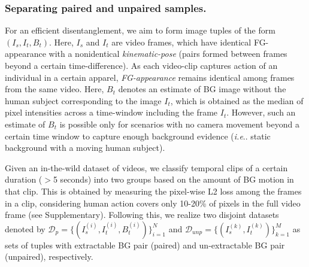 \documentclass[letterpaper]{article} \usepackage{aaai20}  \usepackage{times}  \usepackage{helvet}  \usepackage{courier}  \usepackage{url}  \usepackage{graphicx}  \usepackage{amsmath}
\makeatletter
\DeclareRobustCommand\onedot{\futurelet\@let@token\@onedot}
\def\@onedot{\ifx\@let@token.\else.\null\fi\xspace}
\def\ie{\emph{i.e}\onedot} \def\Ie{\emph{I.e}\onedot}
\makeatother
\begin{document}
\subsubsection{Separating paired and unpaired samples.}


For an efficient disentanglement, we aim to form image tuples of the form $(I_s,I_t, B_t)$. Here, $I_s$ and $I_t$ are video frames, which have identical FG-appearance with a nonidentical \textit{kinematic-pose} (pairs formed between frames beyond a certain time-difference). As each video-clip captures action of an individual in a certain apparel, \textit{FG-appearance} remains identical among frames from the same video. Here, $B_t$ denotes an estimate of BG image without the human subject corresponding to the image $I_t$, which is obtained as the median of pixel intensities across a time-window including the frame $I_t$. However, such an estimate of $B_t$ is possible only for scenarios with no camera movement beyond a certain time window to capture enough background evidence (\ie static background with a moving human subject).

Given an in-the-wild dataset of videos, we classify temporal clips of a certain duration ($>$5 seconds) into two groups based on the amount of BG motion in that clip. This is obtained by measuring the pixel-wise L2 loss among the frames in a clip, considering human action covers only 10-20\% of pixels in the full video frame (see Supplementary). Following this, we realize two disjoint datasets denoted by $\mathcal{D}_{p}=\{(I_s^{(i)},I_t^{(i)},B_t^{(i)})\}_{i=1}^{N}$ and $\mathcal{D}_{unp}=\{(I_s^{(k)}, I_t^{(k)})\}_{k=1}^M$ as sets of tuples with extractable BG pair (paired) and un-extractable BG pair (unpaired), respectively.
\end{document}

